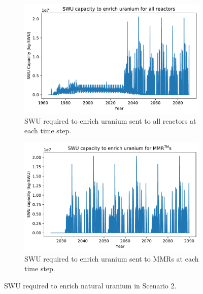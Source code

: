 \begin{figure}
    \centering
    \begin{subfigure}{0.45\textwidth}
        \centering
        \includegraphics[scale=0.4]{../figures/totalswu_scenarios_2.pdf}
        \caption{\gls{SWU} required to enrich uranium sent to all reactors at each time step.}
        \label{fig:totalswu_2}
    \end{subfigure}
    \hspace{0.8cm}
    \begin{subfigure}{0.45\textwidth}
        \centering
        \includegraphics[scale=0.4]{../figures/haleuSWU_scenarios_2.pdf}
        \caption{\gls{SWU} required to enrich uranium sent to \glspl{MMR} at each time step.}
        \label{fig:haleuswu_2}
    \end{subfigure}
    \caption{\gls{SWU} required to enrich natural uranium in Scenario 2.}
    \label{fig:swu_2}
\end{figure}

